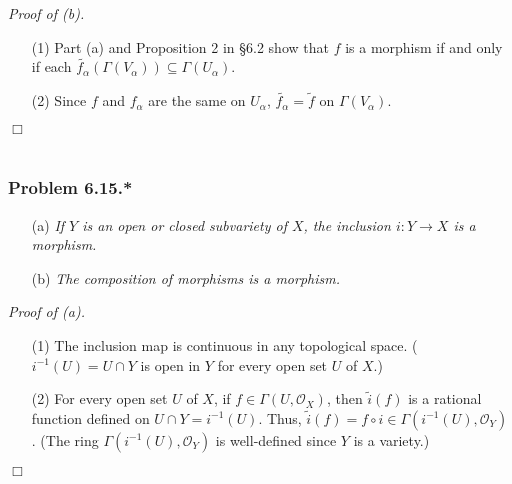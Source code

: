 \documentclass{article}
\begin{document}
\emph{Proof of (b).}
\begin{enumerate}
\item[(1)]
  Part (a) and Proposition 2 in \S 6.2 show that
  $f$ is a morphism if and only if
  each $\widetilde{f_\alpha}(\Gamma(V_\alpha)) \subseteq \Gamma(U_\alpha)$.

\item[(2)]
  Since $f$ and $f_\alpha$ are the same on $U_\alpha$,
  $\widetilde{f_\alpha} = \widetilde{f}$ on $\Gamma(V_\alpha)$.
\end{enumerate}
$\Box$ \\\\






\subsubsection*{Problem 6.15.*}
\begin{enumerate}
\item[(a)]
  \emph{If $Y$ is an open or closed subvariety of $X$,
  the inclusion $i: Y \to X$ is a morphism.}

\item[(b)]
  \emph{The composition of morphisms is a morphism.} \\
\end{enumerate}



\emph{Proof of (a).}
\begin{enumerate}
\item[(1)]
  The inclusion map is continuous in any topological space.
  ($i^{-1}(U) = U \cap Y$ is open in $Y$ for every open set $U$ of $X$.)

\item[(2)]
  For every open set $U$ of $X$,
  if $f \in \Gamma(U, \mathscr{O}_X)$,
  then $\widetilde{i}(f)$ is a rational function defined on $U \cap Y = i^{-1}(U)$.
  Thus, $\widetilde{i}(f) = f \circ i \in \Gamma(i^{-1}(U), \mathscr{O}_Y)$.
  (The ring $\Gamma(i^{-1}(U), \mathscr{O}_Y)$ is well-defined since $Y$ is a variety.)
\end{enumerate}
$\Box$ \\
\end{document}
